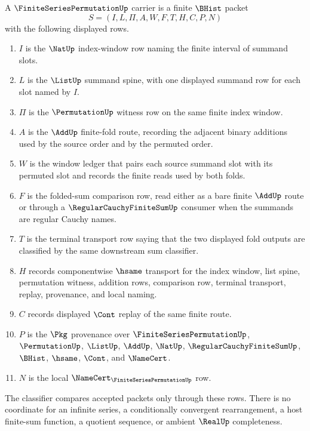 \begin{definition}
\label{def:finite-series-permutation-carrier}
A $\FiniteSeriesPermutationUp$ carrier is a finite $\BHist$ packet
$$
S=(I,L,\Pi,A,W,F,T,H,C,P,N)
$$
with the following displayed rows.
\begin{enumerate}
\item $I$ is the $\NatUp$ index-window row naming the finite interval of summand slots.
\item $L$ is the $\ListUp$ summand spine, with one displayed summand row for each slot named by $I$.
\item $\Pi$ is the $\PermutationUp$ witness row on the same finite index window.
\item $A$ is the $\AddUp$ finite-fold route, recording the adjacent binary additions used by the source order and by the permuted order.
\item $W$ is the window ledger that pairs each source summand slot with its permuted slot and records the finite reads used by both folds.
\item $F$ is the folded-sum comparison row, read either as a bare finite $\AddUp$ route or through a $\RegularCauchyFiniteSumUp$ consumer when the summands are regular Cauchy names.
\item $T$ is the terminal transport row saying that the two displayed fold outputs are classified by the same downstream sum classifier.
\item $H$ records componentwise $\hsame$ transport for the index window, list spine, permutation witness, addition rows, comparison row, terminal transport, replay, provenance, and local naming.
\item $C$ records displayed $\Cont$ replay of the same finite route.
\item $P$ is the $\Pkg$ provenance over $\FiniteSeriesPermutationUp$, $\PermutationUp$, $\ListUp$, $\AddUp$, $\NatUp$, $\RegularCauchyFiniteSumUp$, $\BHist$, $\hsame$, $\Cont$, and $\NameCert$.
\item $N$ is the local $\NameCert_{\FiniteSeriesPermutationUp}$ row.
\end{enumerate}
The classifier compares accepted packets only through these rows. There is no coordinate for an infinite series, a conditionally convergent rearrangement, a host finite-sum function, a quotient sequence, or ambient $\RealUp$ completeness.
\end{definition}


